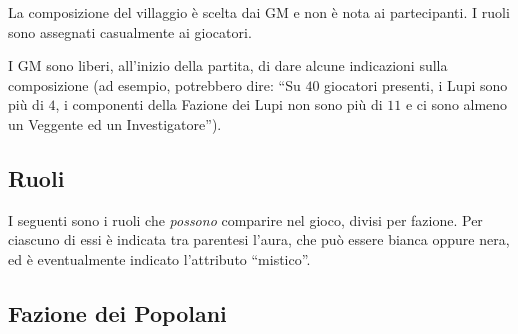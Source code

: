 \documentclass[a4paper,10pt]{article}
\begin{document}
La composizione del villaggio è scelta dai GM e non è nota ai partecipanti. I ruoli sono assegnati casualmente ai giocatori.

I GM sono liberi, all'inizio della partita, di dare alcune indicazioni sulla composizione (ad esempio, potrebbero dire: ``Su $40$ giocatori presenti, i Lupi sono più di $4$, i componenti della Fazione dei Lupi non sono più di $11$ e ci sono almeno un Veggente ed un Investigatore'').


\subsection{Ruoli}
\label{ruoli}


I seguenti sono i ruoli che \emph{possono} comparire nel gioco, divisi per fazione. Per ciascuno di essi è indicata tra parentesi l'aura, che può essere bianca oppure nera, ed è eventualmente indicato l'attributo ``mistico''.


\subsection*{Fazione dei Popolani}
\end{document}
